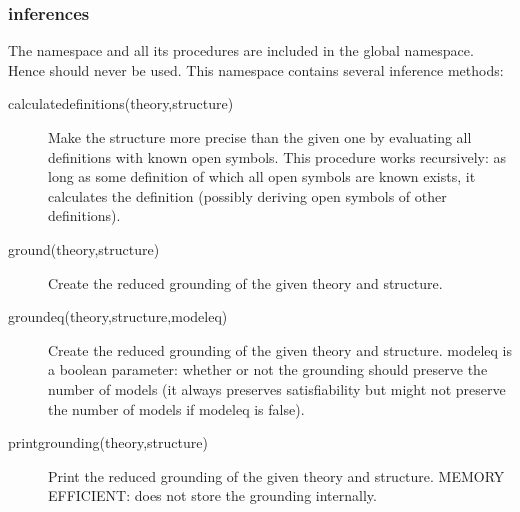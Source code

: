\subsubsection{inferences}
The  namespace and all its procedures are included in the global namespace. Hence  should never be used. This namespace contains several inference methods:
\begin{description}
	\item[calculatedefinitions(theory,structure)]
		Make the structure more precise than the given one by evaluating all definitions with known open symbols. This procedure works recursively: as long as some definition of which all open symbols are known exists, it calculates the definition (possibly deriving open symbols of other definitions).
		
	\item[ground(theory,structure)]
 		Create the reduced grounding of the given theory and structure. 
 	\item[groundeq(theory,structure,modeleq)]
 		Create the reduced grounding of the given theory and structure. modeleq is a boolean parameter:  whether or not the grounding should preserve the number of models (it always preserves satisfiability but might not preserve the number of models if modeleq is false).
 	\item[printgrounding(theory,structure)]
 		Print the reduced grounding of the given theory and structure.
 		MEMORY EFFICIENT: does not store the grounding internally.
 		

\end{description}
